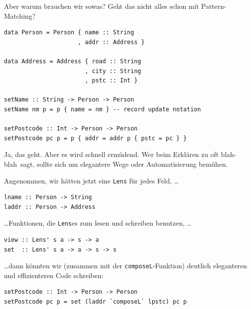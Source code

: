 \documentclass{beamer}
\begin{document}
\begin{frame}[fragile]

Aber warum brauchen wir sowas? Geht das nicht alles schon mit Pattern-Matching?
\pause

\begin{verbatim}
data Person = Person { name :: String
                     , addr :: Address }
                     
data Address = Address { road :: String
                       , city :: String
                       , pstc :: Int }
                       
setName :: String -> Person -> Person 
setName nm p = p { name = nm } -- record update notation

setPostcode :: Int -> Person -> Person
setPostcode pc p = p { addr = addr p { pstc = pc } }
\end{verbatim}

Ja, das geht. Aber es wird schnell ermüdend. Wer beim Erklären zu oft \glqq blah-blah\grqq\ sagt, sollte sich um elegantere Wege oder Automatisierung bemühen.

\end{frame}


\begin{frame}[fragile]

Angenommen, wir hätten jetzt eine \texttt{Lens} für jedes Feld, \dots

\begin{verbatim}
lname :: Person -> String
laddr :: Person -> Address
\end{verbatim}
\pause

\dots Funktionen, die \texttt{Lens}es zum lesen und schreiben benutzen, \dots

\begin{verbatim}
view :: Lens' s a -> s -> a
set  :: Lens' s a -> a -> s -> s
\end{verbatim}
\pause

\dots dann könnten wir (zusammen mit der \texttt{composeL}-Funktion) deutlich eleganteren und effizienteren Code schreiben:\bigskip

\begin{verbatim}
setPostcode :: Int -> Person -> Person
setPostcode pc p = set (laddr `composeL` lpstc) pc p
\end{verbatim}

\end{frame}
\end{document}
